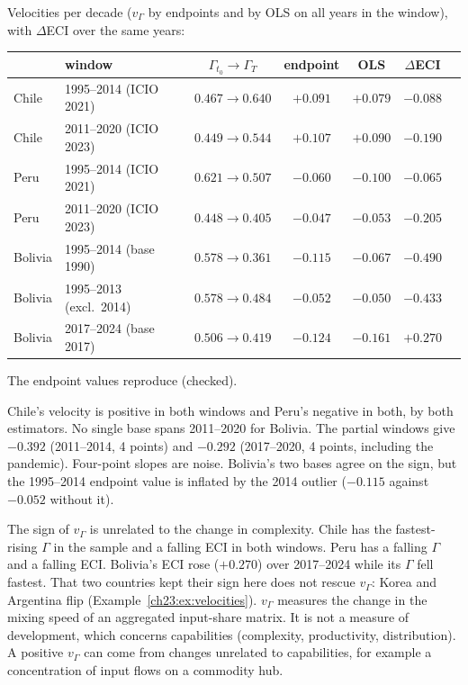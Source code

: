 \documentclass[../solutions_manual.tex]{subfiles}
\begin{document}

 Velocities per decade ($v_\Gamma$ by endpoints and by OLS on all years in the window), with $\Delta$ECI over the same years:
\begin{center}\small
\begin{tabular}{llccccc}
\toprule
& window & $\Gamma_{t_0} \to \Gamma_T$ & endpoint & OLS & $\Delta$ECI \\
\midrule
Chile & 1995--2014 (ICIO 2021) & $0.467 \to 0.640$ & $+0.091$ & $+0.079$ & $-0.088$ \\
Chile & 2011--2020 (ICIO 2023) & $0.449 \to 0.544$ & $+0.107$ & $+0.090$ & $-0.190$ \\
Peru & 1995--2014 (ICIO 2021) & $0.621 \to 0.507$ & $-0.060$ & $-0.100$ & $-0.065$ \\
Peru & 2011--2020 (ICIO 2023) & $0.448 \to 0.405$ & $-0.047$ & $-0.053$ & $-0.205$ \\
Bolivia & 1995--2014 (base 1990) & $0.578 \to 0.361$ & $-0.115$ & $-0.067$ & $-0.490$ \\
Bolivia & 1995--2013 (excl.\ 2014) & $0.578 \to 0.484$ & $-0.052$ & $-0.050$ & $-0.433$ \\
Bolivia & 2017--2024 (base 2017) & $0.506 \to 0.419$ & $-0.124$ & $-0.161$ & $+0.270$ \\
\bottomrule
\end{tabular}
\end{center}
The endpoint values reproduce  (checked).

 Chile's velocity is positive in both windows and Peru's negative in both, by both estimators. No single base spans 2011--2020 for Bolivia. The partial windows give $-0.392$ (2011--2014, 4 points) and $-0.292$ (2017--2020, 4 points, including the pandemic). Four-point slopes are noise. Bolivia's two bases agree on the sign, but the 1995--2014 endpoint value is inflated by the 2014 outlier ($-0.115$ against $-0.052$ without it).

 The sign of $v_\Gamma$ is unrelated to the change in complexity. Chile has the fastest-rising $\Gamma$ in the sample and a falling ECI in both windows. Peru has a falling $\Gamma$ and a falling ECI. Bolivia's ECI rose ($+0.270$) over 2017--2024 while its $\Gamma$ fell fastest. That two countries kept their sign here does not rescue $v_\Gamma$: Korea and Argentina flip (Example~\ref{ch23:ex:velocities}). $v_\Gamma$ measures the change in the mixing speed of an aggregated input-share matrix. It is not a measure of development, which concerns capabilities (complexity, productivity, distribution). A positive $v_\Gamma$ can come from changes unrelated to capabilities, for example a concentration of input flows on a commodity hub.
\end{document}
